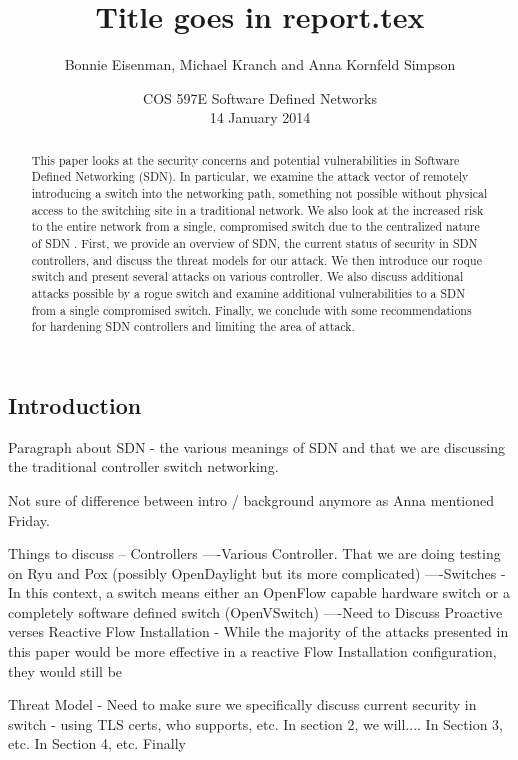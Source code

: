 \documentclass[11pt, letterpaper, twocolumn, twoside]{article}
\title{Title goes in report.tex}
\author{Bonnie Eisenman, Michael Kranch and Anna Kornfeld Simpson}
\date{COS 597E Software Defined Networks \\ 14 January 2014}
\begin{document}
\maketitle

\begin{spacing}{1.0}

\begin{abstract}
This paper looks at the security concerns and potential vulnerabilities in Software Defined Networking (SDN). In particular, we examine the attack vector of remotely introducing a switch into the networking path, something not possible without physical access to the switching site in a traditional network. We also look at the increased risk to the entire network from a single, compromised switch due to the centralized nature of SDN . First, we provide an overview of SDN, the current status of security in SDN controllers, and discuss the threat models for our attack. We then introduce our roque switch and present several  attacks on various controller. We also discuss additional attacks possible by a rogue switch and examine additional vulnerabilities to a SDN from a single compromised switch. Finally, we conclude with some recommendations for hardening SDN controllers and limiting the area of attack.
\end{abstract}


\section{Introduction}
Paragraph about SDN - the various meanings of SDN and that we are discussing the traditional controller switch networking.

Not sure of difference between intro / background anymore as Anna mentioned Friday.

Things to discuss
-- Controllers
----Various Controller. That we are doing testing on Ryu and Pox (possibly OpenDaylight but its more complicated)
----Switches - In this context, a switch means either an OpenFlow capable hardware switch or a completely software defined switch (OpenVSwitch)
----Need to Discuss Proactive verses Reactive Flow Installation - While the majority of the attacks presented in this paper would be more effective in a reactive Flow Installation configuration, they would still be 

Threat Model
- Need to make sure we specifically discuss current security in switch - using TLS certs, who supports, etc.
In section 2, we will.... In Section 3, etc. In Section 4, etc. Finally


\end{spacing}
\end{document}
